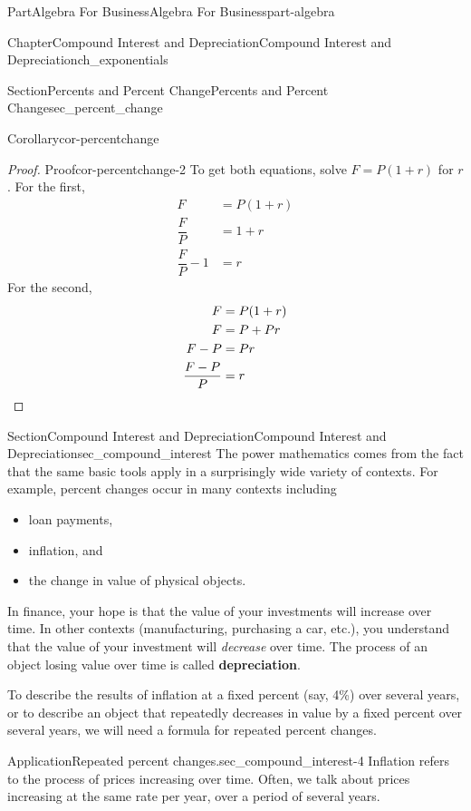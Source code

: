 \documentclass[oneside,10pt,]{tufte-book}
\newcommand{\terminology}[1]{\textbf{#1}}
\numberwithin{equation}{chapter}
\newcommand{\qedhere}{\relax}
\newcommand{\amp}{&}
\begin{document}
\begin{partptx}{Part}{Algebra For Business}{}{Algebra For Business}{}{}{part-algebra}
\begin{chapterptx}{Chapter}{Compound Interest and Depreciation}{}{Compound Interest and Depreciation}{}{}{ch_exponentials}
\begin{sectionptx}{Section}{Percents and Percent Change}{}{Percents and Percent Change}{}{}{sec_percent_change}
\begin{corollary}{Corollary}{}{}{cor-percentchange}
\end{corollary}
\begin{proof}{Proof}{}{cor-percentchange-2}
To get both equations, solve \(F = P(1+r)\) for \(r\). For the first,%
\begin{align*}
F \amp = P(1+r) \\
\dfrac{F}{P} \amp = 1 + r\\
\dfrac{F}{P} - 1 \amp = r
\end{align*}
For the second,%
\begin{align*}
F \amp = P(1+r) \\
F \amp = P+ Pr \\
F - P \amp = Pr \\
\dfrac{F - P}{P} \amp = r \qedhere
\end{align*}
%
\end{proof}
\end{sectionptx}
%
%
\typeout{************************************************}
\typeout{************************************************}
%
\begin{sectionptx}{Section}{Compound Interest and Depreciation}{}{Compound Interest and Depreciation}{}{}{sec_compound_interest}
The power mathematics comes from the fact that the same basic tools apply in a surprisingly wide variety of contexts. For example, percent changes occur in many contexts including%
\begin{itemize}[label=\textbullet]
\item{}loan payments,%
\item{}inflation, and%
\item{}the change in value of physical objects.%
\end{itemize}
In finance, your hope is that the value of your investments will increase over time. In other contexts (manufacturing, purchasing a car, etc.), you understand that the value of your investment will \emph{decrease} over time. The process of an object losing value over time is called \terminology{depreciation}.%
\par
To describe the results of inflation at a fixed percent (say, 4\%) over several years, or to describe an object that repeatedly decreases in value by a fixed percent over several years, we will need a formula for repeated percent changes.%
\begin{insight}{Application}{Repeated percent changes.}{sec_compound_interest-4}%
Inflation refers to the process of prices increasing over time. Often, we talk about prices increasing at the same rate per year, over a period of several years.%

\end{insight}
\end{sectionptx}
\end{chapterptx}
\end{partptx}
\end{document}
